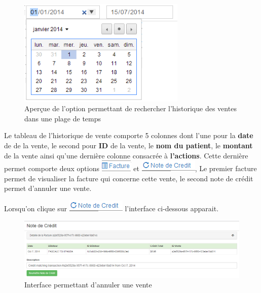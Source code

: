 \documentclass[12pt,a4paper]{report}
\begin{document}
\begin{figure}[h]
\begin{center}
\includegraphics[width=8cm]{pic/SelectPlageValeur.png}
\end{center}
\caption{Aperçue de l'option permettant de rechercher l'historique des ventes dans une plage de temps}
\label{Aperçue de l'option permettant de rechercher l'historique des ventes dans une plage de temps}
\end{figure}

Le tableau de l'historique de vente comporte 5 colonnes dont l'une pour la\textbf{ date} de de la vente, le second pour \textbf{ID }de la vente, le \textbf{nom du patient}, le \textbf{montant} de la vente ainsi qu'une dernière colonne consacrée à \textbf{l'actions}. Cette dernière permet comporte deux options \includegraphics[scale=0.7]{pic/FactureF.png}  et \includegraphics[scale=0.7]{pic/NoteCredit.png}, Le premier facture permet de visualiser  la facture qui concerne cette vente, le second note de crédit permet d'annuler une vente. 

Lorsqu'on clique sur \includegraphics[scale=0.7]{pic/NoteCredit.png}  l'interface ci-dessous apparait.

\begin{figure}[h]
\begin{center}
\includegraphics[width=14cm]{pic/NoteCreditMenu.png}
\end{center}
\caption{Interface permettant d'annuler une vente}
\label{Interface permettant d'annuler une vente}
\end{figure}
\end{document}
